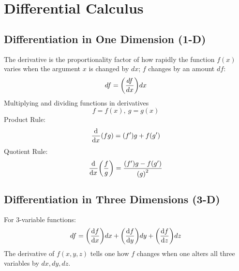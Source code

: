 \section{Differential Calculus}
    \subsection*{Differentiation in One Dimension (1-D)}
        The derivative is the proportionality factor of how rapidly the function \(f(x)\) varies when the argument \(x\) is changed by \(dx\); \(f\) changes by an amount \(df\):
        \begin{align*}
            df = \qty(\frac{df}{dx})dx
        \end{align*}
        Multiplying and dividing functions in derivatives \[f=f(x),~g=g(x)\]
        Product Rule:
        \begin{equation}
            \der{x}(fg)=(f')g+f(g')
        \end{equation}
        Quotient Rule:
        \begin{equation}
            \der{x}\qty(\frac{f}{g})=\frac{(f')g-f(g')}{{(g)}^2}
        \end{equation}
    \subsection*{Differentiation in Three Dimensions (3-D)}
        For 3-variable functions:
        \begin{align*}
            df =\qty(\dv{f}{x})dx + \qty(\dv{f}{y})dy + \qty(\dv{f}{z})dz
        \end{align*}
        The derivative of \(f(x,y,z)\) tells one how \(f\) changes when one alters all three variables by \(dx, dy, dz\).
